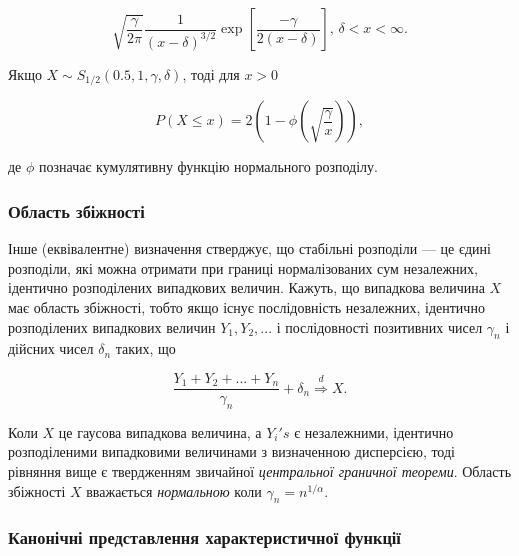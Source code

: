 \documentclass[
  letterpaper,
]{report}
\begin{document}
\[ 
\sqrt{\frac{\gamma}{2\pi}}\frac{1}{(x-\delta)^{3/2}}\exp{\left[ \frac{-\gamma}{2(x-\delta)} \right]}, \, \delta < x < \infty. 
\]

Якщо \(X \sim S_{1/2}(0.5, 1, \gamma, \delta)\), тоді для \(x > 0\)

\[ 
P(X \leq x) = 2 \left( 1 - \phi \left( \sqrt{\frac{\gamma}{x}} \right) \right), 
\]

де \(\phi\) позначає кумулятивну функцію нормального розподілу.

\hypertarget{ux43eux431ux43bux430ux441ux442ux44c-ux437ux431ux456ux436ux43dux43eux441ux442ux456}{%
\subsubsection{Область
збіжності}\label{ux43eux431ux43bux430ux441ux442ux44c-ux437ux431ux456ux436ux43dux43eux441ux442ux456}}

Інше (еквівалентне) визначення стверджує, що стабільні розподіли --- це
єдині розподіли, які можна отримати при границі нормалізованих сум
незалежних, ідентично розподілених випадкових величин. Кажуть, що
випадкова величина \(X\) має область збіжності, тобто якщо існує
послідовність незалежних, ідентично розподілених випадкових величин
\(Y_1, Y_2, ...\) і послідовності позитивних чисел \({\gamma_n}\) і
дійсних чисел \({\delta_n}\) таких, що

\[  
\frac{Y_1 + Y_2 + ... + Y_n}{\gamma_n} + \delta_n \stackrel{d}{\Rightarrow} X.  
\]

Коли \(X\) це гаусова випадкова величина, а \(Y_i's\) є незалежними,
ідентично розподіленими випадковими величинами з визначенною дисперсією,
тоді рівняння вище є твердженням звичайної \emph{центральної граничної
теореми}. Область збіжності \(X\) вважається \emph{нормальною} коли
\(\gamma_n = n^{1/\alpha}\).

\hypertarget{ux43aux430ux43dux43eux43dux456ux447ux43dux456-ux43fux440ux435ux434ux441ux442ux430ux432ux43bux435ux43dux43dux44f-ux445ux430ux440ux430ux43aux442ux435ux440ux438ux441ux442ux438ux447ux43dux43eux457-ux444ux443ux43dux43aux446ux456ux457}{%
\subsubsection{Канонічні представлення характеристичної
функції}\label{ux43aux430ux43dux43eux43dux456ux447ux43dux456-ux43fux440ux435ux434ux441ux442ux430ux432ux43bux435ux43dux43dux44f-ux445ux430ux440ux430ux43aux442ux435ux440ux438ux441ux442ux438ux447ux43dux43eux457-ux444ux443ux43dux43aux446ux456ux457}}
\end{document}
